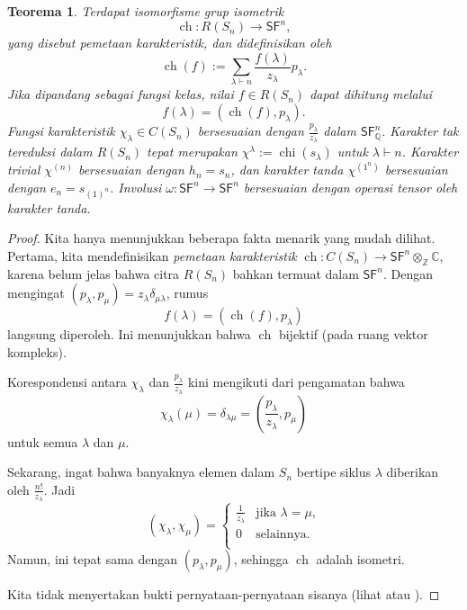 \documentclass[12pt]{article}
\theoremstyle{plain}
\newtheorem{theorem}{Teorema}[section]
\theoremstyle{definition}
\theoremstyle{remark}
\numberwithin{equation}{section}
\begin{document}
\begin{theorem}
Terdapat isomorfisme grup isometrik
\[
\operatorname{ch} : R(S_n) \to \mathsf{SF}^n,
\]
yang disebut \emph{pemetaan karakteristik}, dan didefinisikan oleh
\[
\operatorname{ch}(f) :=
\sum_{\lambda \vdash n} \frac{f(\lambda)}{z_\lambda} p_{\lambda}.
\]
Jika dipandang sebagai fungsi kelas, nilai $f \in R(S_n)$
dapat dihitung melalui
\[
f(\lambda) = ( \operatorname{ch}(f), p_\lambda ).
\]
Fungsi karakteristik $\chi_\lambda \in C(S_n)$
bersesuaian dengan $\frac{p_{\lambda}}{z_\lambda}$ dalam
$\mathsf{SF}^n_{\mathbb{Q}}$.
Karakter tak tereduksi dalam $R(S_n)$
tepat merupakan $\chi^\lambda := \operatorname{chi}(s_\lambda)$
untuk $\lambda \vdash n$.
Karakter trivial $\chi^{(n)}$ bersesuaian dengan $h_n=s_n$, dan
karakter tanda $\chi^{(1^n)}$ bersesuaian dengan $e_n=s_{(1)^n}$.
Involusi $\omega : \mathsf{SF}^n \to \mathsf{SF}^n$
bersesuaian dengan operasi tensor oleh karakter tanda.

\end{theorem}
\begin{proof}
Kita hanya menunjukkan beberapa fakta menarik yang mudah dilihat.
Pertama, kita mendefinisikan \emph{pemetaan karakteristik}
$\operatorname{ch} : C(S_n) \to
\mathsf{SF}^n \otimes_{\mathbb{Z}} \mathbb{C}$,
karena belum jelas bahwa citra $R(S_n)$ bahkan
termuat dalam $\mathsf{SF}^n$.
Dengan mengingat $(p_\lambda,p_\mu)=z_\lambda \delta_{\mu \lambda}$, rumus
\[
f(\lambda) = ( \operatorname{ch}(f), p_\lambda )
\]
langsung diperoleh. Ini menunjukkan bahwa $\operatorname{ch}$ bijektif
(pada ruang vektor kompleks).

Korespondensi antara
$\chi_\lambda$ dan $\frac{p_{\lambda}}{z_\lambda}$
kini mengikuti dari pengamatan bahwa
\[
\chi_\lambda(\mu) = \delta_{\lambda \mu} =
\left(\frac{p_{\lambda}}{z_\lambda}, p_\mu\right)
\]
untuk semua $\lambda$ dan $\mu$.

Sekarang, ingat bahwa banyaknya elemen dalam $S_n$ bertipe siklus
$\lambda$ diberikan oleh $\frac{n!}{z_\lambda}$. Jadi
\[
(\chi_\lambda, \chi_\mu) =
\begin{cases}
\frac{1}{z_\lambda} & \textrm{jika $\lambda=\mu$,}\\
0 & \textrm{selainnya.}\\
\end{cases}
\]
Namun, ini tepat sama dengan $(p_\lambda,p_\mu)$,
sehingga $\operatorname{ch}$ adalah isometri.

Kita tidak menyertakan bukti pernyataan-pernyataan sisanya
(lihat \cite[\S{I.7}]{Macdonald} atau \cite[\S{7.18}]{Stanley2}).
\end{proof}
\end{document}
